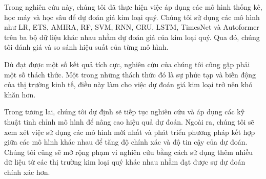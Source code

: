 Trong nghiên cứu này, chúng tôi đã thực hiện việc áp dụng các mô hình thống kê, học máy và học sâu để dự đoán giá kim loại quý. Chúng tôi sử dụng các mô hình như LR, ETS, AMIRA, RF, SVM, RNN, GRU, LSTM, TimesNet và Autoformer trên ba bộ dữ liệu khác nhau nhằm dự đoán giá của kim loại quý. Qua đó, chúng tôi đánh giá và so sánh hiệu suất của từng mô hình.

Dù đạt được một số kết quả tích cực, nghiên cứu của chúng tôi cũng gặp phải một số thách thức. Một trong những thách thức đó là sự phức tạp và biến động của thị trường kinh tế, điều này làm cho việc dự đoán giá kim loại trở nên khó khăn hơn.

Trong tương lai, chúng tôi dự định sẽ tiếp tục nghiên cứu và áp dụng các kỹ thuật tinh chỉnh mô hình để nâng cao hiệu quả dự đoán. Ngoài ra, chúng tôi sẽ xem xét việc sử dụng các mô hình mới nhất và phát triển phương pháp kết hợp giữa các mô hình khác nhau để tăng độ chính xác và độ tin cậy của dự đoán. Chúng tôi cũng sẽ mở rộng phạm vi nghiên cứu bằng cách sử dụng thêm nhiều dữ liệu từ các thị trường kim loại quý khác nhau nhằm đạt được sự dự đoán chính xác hơn.